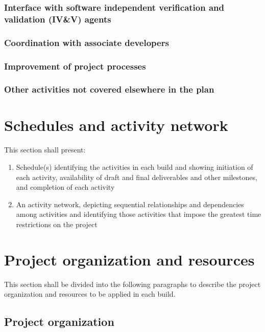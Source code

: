 \documentclass{fidata-report-template}
\begin{document}
\subsubsection{Interface with software independent verification and
validation (IV\&V) agents}

\subsubsection{Coordination with associate developers}

\subsubsection{Improvement of project processes}

\subsubsection{Other activities not covered elsewhere in the plan}

\section{Schedules and activity network}

This section shall present:

\begin{enumerate}
\itemsep1pt\parskip0pt
\item
  Schedule(s) identifying the activities in each build and showing
  initiation of each activity, availability of draft and final
  deliverables and other milestones, and completion of each activity
\item
  An activity network, depicting sequential relationships and
  dependencies among activities and identifying those activities that
  impose the greatest time restrictions on the project
\end{enumerate}

\section{Project organization and resources}

This section shall be divided into the following paragraphs to describe
the project organization and resources to be applied in each build.

\subsection{Project organization}
\end{document}
